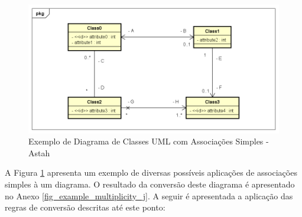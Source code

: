 \begin{figure}
    \begin{center}
        \includegraphics[scale=0.7]{imagens/Example_Multiplicity.png}
    \end{center}
	\caption{\label{fig_example_multiplicity}Exemplo de Diagrama de Classes UML com Associações Simples - Astah}
\end{figure}

A Figura \ref{fig_example_multiplicity} apresenta um exemplo de diversas possíveis aplicações de associações simples à um diagrama. O resultado da conversão deste diagrama é apresentado no Anexo \ref{fig_example_multiplicity_j}. A seguir é apresentada a aplicação das regras de conversão descritas até este ponto:

